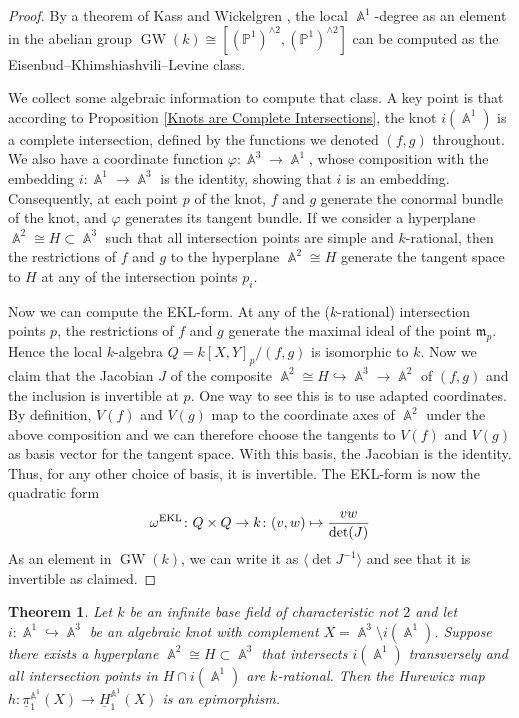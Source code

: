 \documentclass[english]{amsart}
\newtheorem{thm}[prop]{Theorem}
\theoremstyle{definition}
\DeclareMathOperator{\A}{\mathbb{A}}
\DeclareMathOperator{\GW}{GW}
\begin{document}
\begin{proof}
By a theorem of Kass and Wickelgren \cite{kass:wickelgren:local-degree}, the local $\A^1$-degree as an element in the abelian group $\GW(k) \cong [(\mathbb{P}^1)^{\wedge 2},(\mathbb{P}^1)^{\wedge 2}]$ can be computed as the Eisenbud--Khimshiashvili--Levine class. 

We collect some algebraic information to compute that class. A key point is that according to Proposition \ref{Knots are Complete Intersections}, the knot $i(\A^1)$ is a complete intersection, defined by the functions we denoted $(f,g)$ throughout. We also have a coordinate function $\varphi \colon \A^3 \to \A^1$, whose composition with the embedding $i\colon\A^1\to\A^3$ is the identity, showing that $i$ is an embedding. Consequently, at each point $p$ of the knot, $f$ and $g$ generate the conormal bundle of the knot, and $\varphi$ generates its tangent bundle. If we consider a hyperplane $\A^2 \cong H \subset \A^3$ such that all intersection points are simple and $k$-rational, then the restrictions of $f$ and $g$ to the hyperplane $\A^2 \cong H$ generate the tangent space to $H$ at any of the intersection points $p_i$. 

Now we can compute the EKL-form. At any of the ($k$-rational) intersection points $p$, the restrictions of $f$ and $g$ generate the maximal ideal of the point $\mathfrak{m}_p$. Hence the local $k$-algebra $Q=k[X,Y]_p/(f,g)$ is isomorphic to $k$. Now we claim that the Jacobian $J$ of the composite $\A^2\cong H\hookrightarrow \A^3\to\A^2$ of $(f,g)$ and the inclusion is invertible at $p$. One way to see this is to use adapted coordinates. By definition, $V(f)$ and $V(g)$ map to the coordinate axes of $\A^2$ under the above composition and we can therefore choose the tangents to $V(f)$ and $V(g)$ as basis vector for the tangent space. With this basis, the Jacobian is the identity. Thus, for any other choice of basis, it is invertible. The EKL-form is now the quadratic form 
\[
\omega^{\rm EKL}\colon Q\times Q\to k\colon(v,w)\mapsto \frac{vw}{\det(J)}
\]
As an element in $\GW(k)$, we can write it as $\langle \det J^{-1}\rangle$ and see that it is invertible as claimed.
\end{proof}

\begin{thm}
\label{thm:hurewicz-knot-complement}
    Let $k$ be an infinite base field of characteristic not $2$ and let $i\colon \A^1\hookrightarrow\A^3$ be an algebraic knot with complement $X = \A^3 \setminus i(\A^1)$. Suppose there exists a hyperplane $\A^2  \cong H \subset \A^3$ that intersects $i(\A^1)$ transversely and all intersection points in $H\cap i(\A^1)$ are $k$-rational. Then the Hurewicz map $h\colon\underline{\pi}_1^{\A^1}\!(X)\to\underline{H}_1^{\A^1}\!(X)$ is an epimorphism. 
\end{thm}
\end{document}
